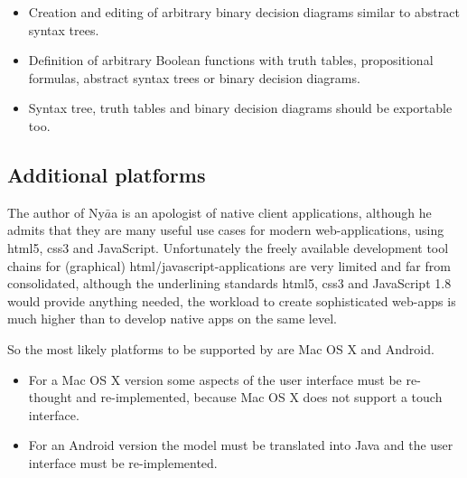 \begin{itemize}

\item Creation and editing of arbitrary binary decision diagrams similar to abstract syntax trees.

\item Definition of arbitrary Boolean functions with truth tables, propositional formulas, abstract syntax trees or binary decision diagrams.

\item Syntax tree, truth tables and binary decision diagrams should be exportable too.

\end{itemize}


\subsection{Additional platforms}

The author of Ny$\bar{a}$a is an apologist of native client applications,
although he admits that they are many useful use cases for modern web-applications, 
using html5, css3 and JavaScript. 
Unfortunately the freely available development tool chains for (graphical) html/javascript-applications
are very limited and far from consolidated, although the underlining standards html5, css3 
and JavaScript 1.8 would provide anything needed, the workload to create sophisticated web-apps 
is much higher than to develop native apps on the same level.

So the most likely platforms to be supported by \Nyaya are Mac OS X and Android.

\begin{itemize}
\item
For a Mac OS X version some aspects of the user interface must be re-thought and re-implemented, 
because Mac OS X does not support a touch interface.
\item
For an Android version the model must be translated into Java and the user interface must be re-implemented.
\end{itemize}

